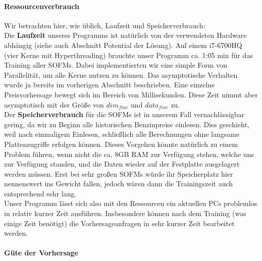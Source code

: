 \documentclass[11pt]{article}
\begin{document}
	\paragraph{Ressourcenverbrauch\\}
	Wir betrachten hier, wie üblich, Laufzeit und Speicherverbrauch:\\
	Die \textbf{Laufzeit} unseres Programms ist natürlich von der verwendeten Hardware abhängig (siehe auch Abschnitt \glqq Potential der Lösung\grqq{}). Auf einem i7-6700HQ (vier Kerne mit Hyperthreading) brauchte unser Programm ca. 1:05 min für das Training aller SOFMs. Dabei implementierten wir eine simple Form von Parallelität, um alle Kerne nutzen zu können. Das asymptotische Verhalten wurde ja bereits im vorherigen Abschnitt beschrieben. Eine einzelne Preisvorhersage bewegt sich im Bereich von Millisekunden. Diese Zeit nimmt aber asymptotisch mit der Größe von $dim_{fine}$ und $data_{fine}$ zu.\\
	Der \textbf{Speicherverbrauch} für die SOFMs ist in unserem Fall vernachlässigbar gering, da wir zu Beginn alle historischen Benzinpreise einlesen. Dies geschieht, weil nach einmaligem Einlesen, schließlich alle Berechnungen ohne langsame Plattenzugriffe erfolgen können. Dieses Vorgehen könnte natürlich zu einem Problem führen, wenn nicht die ca. 8GB RAM zur Verfügung stehen, welche uns zur Verfügung standen, und die Daten wieder auf der Festplatte ausgelagert werden müssen. Erst bei sehr großen SOFMs würde ihr Speicherplatz hier nennenswert ins Gewicht fallen, jedoch wären dann die Trainingszeit auch entsprechend sehr lang.\\
	Unser Programm lässt sich also mit den Ressourcen ein aktuellen PCs problemlos in relativ kurzer Zeit ausführen. Insbesondere können nach dem Training (was einige Zeit benötigt) die Vorhersageanfragen in sehr kurzer Zeit bearbeitet werden.
	
	\paragraph{Güte der Vorhersage\\}
	

\end{document}

